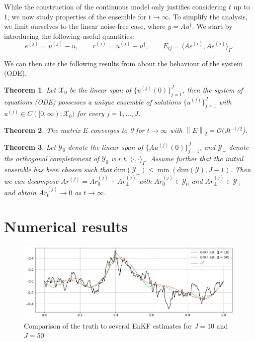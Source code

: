 \documentclass[10pt,a4paper]{article}
\newtheorem{theorem}{Theorem}
\newcommand{\norm}[1]{\left\lVert#1\right\rVert}
\begin{document}
While the construction of the continuous model only justifies considering $t$ up to $1$, we now study properties of the ensemble for $t \rightarrow \infty$.
To simplify the analysis, we limit ourselves to the linear noise-free case, where
$y = Au^\dagger$. We start by introducing the following useful quantities:
\begin{equation*}
    e^{(j)} = u^{(j)} - \overline{u},
    \qquad 
    r^{(j)} = u^{(j)} - u^\dagger,
    \qquad
    E_{ij} = \langle Ae^{(i)}, Ae^{(j)} \rangle_\Gamma.
\end{equation*}

We can then cite the following results from \cite{schillings2017analysis} about the behaviour 
of the system (ODE).

\begin{theorem}
    Let $\mathcal{X}_0$ be the linear span of $\{u^{(j)}(0)\}_{j=1}^J$, then the system of equations
    (ODE) possesses a unique ensemble of solutions $\{u^{(j)}\}_{j=1}^J$ with $u^{(j)} \in C([0, \infty); \mathcal{X}_0)$
    for every $j = 1, \ldots, J$.
\end{theorem}

\begin{theorem}
    The matrix $E$ converges to 0 for $t \rightarrow \infty$ with $\norm{E}_2 = \mathcal{O}(Jt^{-1/2}$).
\end{theorem}

\begin{theorem}
    Let $\mathcal{Y}_0$ denote the linear span of $\{Au^{(j)}(0)\}_{j=1}^J$, and $\mathcal{Y}_\bot$ denote the orthogonal
    completement of $\mathcal{Y}_0$ w.r.t. $\langle \cdot, \cdot \rangle_\Gamma$. Assume further that the initial ensemble
    has been chosen such that $\text{dim}(\mathcal{Y}_\bot) \le \min (\text{dim}(\mathcal{Y}), J-1)$. Then
    we can decompose $Ar^{(j)} = Ar^{(j)}_0 + Ar^{(j)}_\bot$ with $Ar^{(j)}_0 \in \mathcal{Y}_0$ and $Ar^{(j)}_\bot \in \mathcal{Y}_\bot$
    and obtain $Ar^{(j)}_0 \rightarrow 0$ as $t \rightarrow \infty$.

\end{theorem}

\section*{Numerical results}

\begin{figure}[h]
    \centering
    \includegraphics[scale=0.35]{multi_plot.png}
    \caption{Comparison of the truth to several EnKF estimates for $J = 10$ and $J = 50$}
\end{figure}
\end{document}
